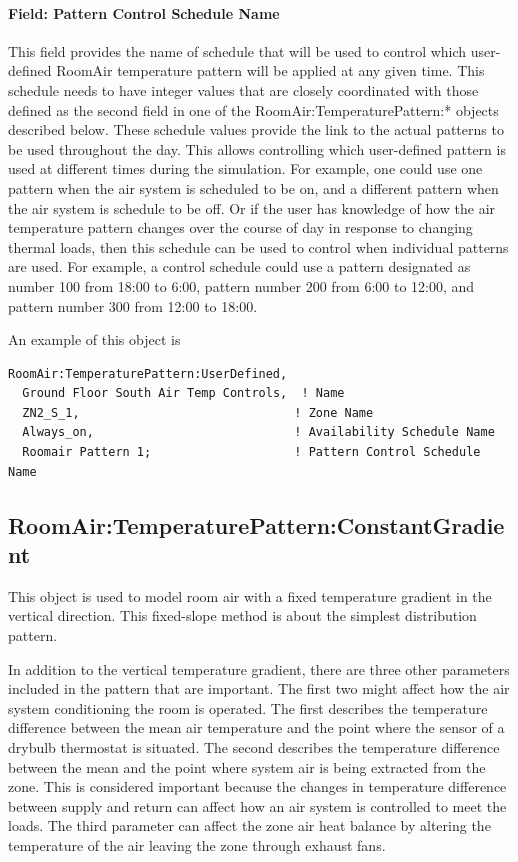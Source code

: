 \paragraph{Field: Pattern Control Schedule Name}\label{field-pattern-control-schedule-name}

This field provides the name of schedule that will be used to control which user-defined RoomAir temperature pattern will be applied at any given time. This schedule needs to have integer values that are closely coordinated with those defined as the second field in one of the RoomAir:TemperaturePattern:* objects described below. These schedule values provide the link to the actual patterns to be used throughout the day. This allows controlling which user-defined pattern is used at different times during the simulation. For example, one could use one pattern when the air system is scheduled to be on, and a different pattern when the air system is schedule to be off. Or if the user has knowledge of how the air temperature pattern changes over the course of day in response to changing thermal loads, then this schedule can be used to control when individual patterns are used. For example, a control schedule could use a pattern designated as number 100 from 18:00 to 6:00, pattern number 200 from 6:00 to 12:00, and pattern number 300 from 12:00 to 18:00.

An example of this object is

\begin{lstlisting}
RoomAir:TemperaturePattern:UserDefined,
  Ground Floor South Air Temp Controls,  ! Name
  ZN2_S_1,                              ! Zone Name
  Always_on,                            ! Availability Schedule Name
  Roomair Pattern 1;                    ! Pattern Control Schedule Name
\end{lstlisting}

\subsection{RoomAir:TemperaturePattern:ConstantGradient}\label{roomairtemperaturepatternconstantgradient}

This object is used to model room air with a fixed temperature gradient in the vertical direction. This fixed-slope method is about the simplest distribution pattern.

In addition to the vertical temperature gradient, there are three other parameters included in the pattern that are important. The first two might affect how the air system conditioning the room is operated. The first describes the temperature difference between the mean air temperature and the point where the sensor of a drybulb thermostat is situated. The second describes the temperature difference between the mean and the point where system air is being extracted from the zone. This is considered important because the changes in temperature difference between supply and return can affect how an air system is controlled to meet the loads. The third parameter can affect the zone air heat balance by altering the temperature of the air leaving the zone through exhaust fans.

